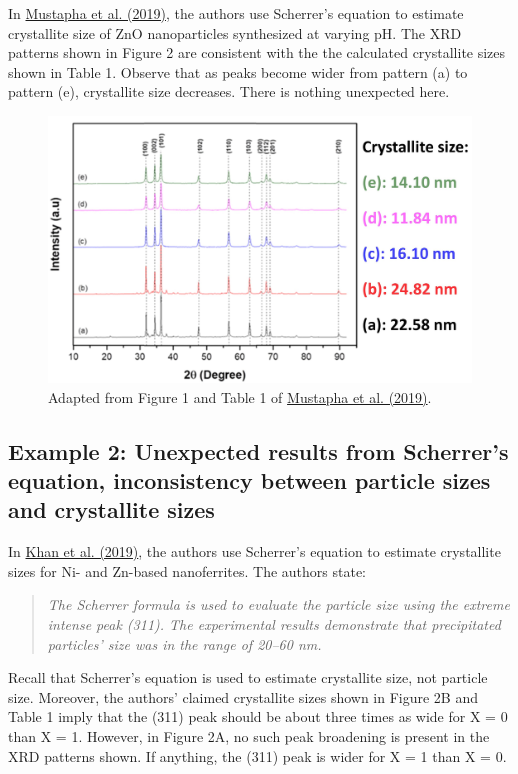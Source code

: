 \documentclass[letterpaper, 12pt]{article}
\begin{document}
In \href{https://10.0.4.64/2043-6254/ab52f7}{Mustapha et al. (2019)}, the authors use Scherrer's equation to estimate crystallite size of ZnO nanoparticles synthesized at varying pH. The XRD patterns shown in Figure 2 are consistent with the the calculated crystallite sizes shown in Table 1. Observe that as peaks become wider from pattern (a) to pattern (e), crystallite size decreases. There is nothing unexpected here. 

\begin{figure}[h!tbp]
    \includegraphics[width=\textwidth]{img/xrd/xrd_publication_mockup_mustapha.jpg}
    \caption*{Adapted from Figure 1 and Table 1 of \href{https://10.0.4.64/2043-6254/ab52f7}{Mustapha et al. (2019)}.}
\end{figure}

\subsection*{Example 2: Unexpected results from Scherrer's equation, inconsistency between particle sizes and crystallite sizes}

In \href{https://doi.org/10.3390/nano9071024}{Khan et al. (2019)}, the authors use Scherrer's equation to estimate crystallite sizes for Ni- and Zn-based nanoferrites. The authors state:

\begin{quote}
    \textit{The Scherrer formula is used to evaluate the particle size using the extreme intense peak (311). The experimental results demonstrate that precipitated particles’ size was in the range of 20–60 nm.}
\end{quote}

Recall that Scherrer's equation is used to estimate crystallite size, not particle size. Moreover, the authors' claimed crystallite sizes shown in Figure 2B and Table 1 imply that the (311) peak should be about three times as wide for X = 0 than X = 1. However, in Figure 2A, no such peak broadening is present in the XRD patterns shown. If anything, the (311) peak is wider for X = 1 than X = 0. 
\end{document}
